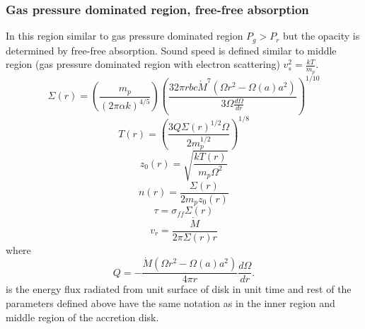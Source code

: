 \documentclass[useAMS,usenatbib]{mn2e}
\begin{document}
\subsubsection{Gas pressure dominated region, free-free absorption}
In this region similar to gas pressure dominated region $P_g > P_r$ but the opacity is determined by free-free absorption. Sound speed is defined similar to middle region (gas pressure dominated region with electron scattering) $v^2_s = \frac{kT}{m_p}$.
\begin{equation}
\Sigma (r) = \left(\frac{m_p}{(2\pi\alpha k)^{4/5}}\right)\left(\frac{32\pi r bc \dot{M}^7\left(\Omega r^2 - \Omega(a) a^2\right)}{3\Omega\frac{d\Omega}{dr}}\right)^{1/10}
\end{equation}
\begin{equation}
T(r) = \left(\frac{3Q \Sigma(r)^{1/2}\Omega}{2 m_p^{1/2}}\right)^{1/8}
\end{equation}
\begin{equation}
z_0(r) = \sqrt{\frac{k T(r)}{m_p\Omega^2}}
\end{equation}
\begin{equation}
n(r) = \frac{\Sigma(r)}{2m_p z_0(r)}
\end{equation}
\begin{equation}
\tau = \sigma_{ff}\Sigma(r)
\end{equation}
\begin{equation}
v_r = \frac{\dot{M}}{2\pi\Sigma(r) r}
\end{equation}
where 
\begin{equation}
Q = -\frac{\dot{M}\left(\Omega r^2 - \Omega(a)a^2\right)}{4\pi r}\frac{d\Omega}{dr}.
\end{equation}
is the energy flux radiated from unit surface of disk in unit time and rest of the parameters defined above have the same notation as in the inner region and middle region of the accretion disk.
\end{document}
